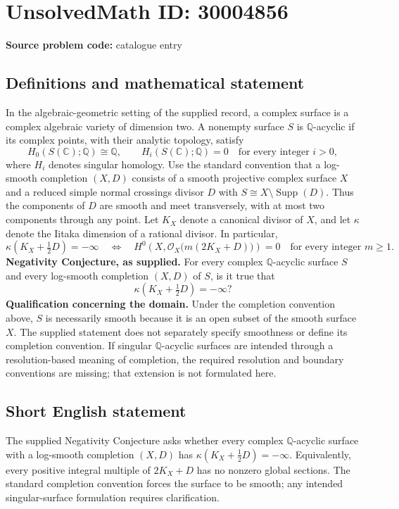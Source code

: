 \documentclass[11pt]{article}
\newcommand{\Q}{\mathbb{Q}}
\newcommand{\C}{\mathbb{C}}
\begin{document}
\section*{UnsolvedMath ID: 30004856}
\textbf{Source problem code:} catalogue entry
\subsection{Definitions and mathematical statement}
In the algebraic-geometric setting of the supplied record, a complex surface is a complex algebraic variety of dimension two. A nonempty surface \(S\) is \(\Q\)-acyclic if its complex points, with their analytic topology, satisfy
\[
H_0(S(\C);\Q)\cong\Q,\qquad H_i(S(\C);\Q)=0\quad\text{for every integer }i>0,
\]
where \(H_i\) denotes singular homology. Use the standard convention that a log-smooth completion \((X,D)\) consists of a smooth projective complex surface \(X\) and a reduced simple normal crossings divisor \(D\) with \(S\cong X\setminus\operatorname{Supp}(D)\). Thus the components of \(D\) are smooth and meet transversely, with at most two components through any point. Let \(K_X\) denote a canonical divisor of \(X\), and let \(\kappa\) denote the Iitaka dimension of a rational divisor. In particular,
\[
\kappa\!\left(K_X+\tfrac12D\right)=-\infty
\quad\Longleftrightarrow\quad
H^0\!\left(X,\mathcal O_X\bigl(m(2K_X+D)\bigr)\right)=0
\quad\text{for every integer }m\geq1.
\]
\textbf{Negativity Conjecture, as supplied.} For every complex \(\Q\)-acyclic surface \(S\) and every log-smooth completion \((X,D)\) of \(S\), is it true that
\[
\kappa\!\left(K_X+\tfrac12D\right)=-\infty?
\]
\textbf{Qualification concerning the domain.} Under the completion convention above, \(S\) is necessarily smooth because it is an open subset of the smooth surface \(X\). The supplied statement does not separately specify smoothness or define its completion convention. If singular \(\Q\)-acyclic surfaces are intended through a resolution-based meaning of completion, the required resolution and boundary conventions are missing; that extension is not formulated here.
\subsection{Short English statement}
The supplied Negativity Conjecture asks whether every complex \(\Q\)-acyclic surface with a log-smooth completion \((X,D)\) has \(\kappa(K_X+\tfrac12D)=-\infty\). Equivalently, every positive integral multiple of \(2K_X+D\) has no nonzero global sections. The standard completion convention forces the surface to be smooth; any intended singular-surface formulation requires clarification.
\end{document}
